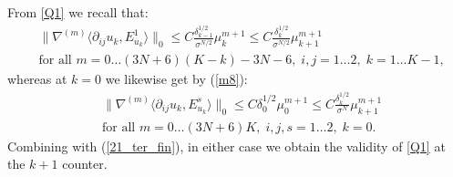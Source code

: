 \documentclass[reqno,twoside,11pt]{amsart}
\numberwithin{equation}{section}
\theoremstyle{plain}
\theoremstyle{definition}
\begin{document}
From \ref{Q1} we recall that:
\begin{equation*}
\begin{split}
& \|\nabla^{(m)}\langle \partial_{ij} u_k, E^1_{u_k}\rangle\|_0\leq
C\frac{\delta_{k-1}^{1/2}}{\sigma^{N/2}}\mu_k^{m+1}\leq C
\frac{\delta_k^{1/2}}{\sigma^{N/2}}\mu_{k+1}^{m+1}
\\ & \mbox{for all } m=0\ldots (3N+6)(K-k)-3N-6, \; i,j=1\ldots 2,\; k=1\ldots K-1,
\end{split}
\end{equation*}
whereas at $k=0$ we likewise get by (\ref{m8}):
\begin{equation}\label{kalb12}
\begin{split}
& \|\nabla^{(m)}\langle \partial_{ij} u_k, E^s_{u_k}\rangle\|_0\leq
C\delta_0^{1/2}\mu_0^{m+1}\leq C
\frac{\delta_k^{1/2}}{\sigma^{N}}\mu_{k+1}^{m+1}
\\ & \mbox{for all } m=0\ldots (3N+6)K, \; i,j,s=1\ldots 2,\; k=0.
\end{split}
\end{equation}
Combining with (\ref{21_ter_fin}), in either case we obtain the
validity of \ref{Q1} at the $k+1$ counter.

\smallskip
\end{document}
